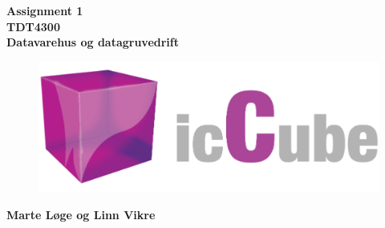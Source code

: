 \begin{titlepage}
\begin{center}

{\Huge \bf Assignment 1} \\[1.0cm]
{\Huge \bf TDT4300} \\[1.0cm]
{\Large \bf Datavarehus og datagruvedrift}\\[4.0cm]

\begin{figure}[H]
	\includegraphics[width=\textwidth]{iccube.png}
\end{figure}

\vspace{6cm}

{\Large \bf Marte Løge og Linn Vikre}


\end{center}
\end{titlepage}